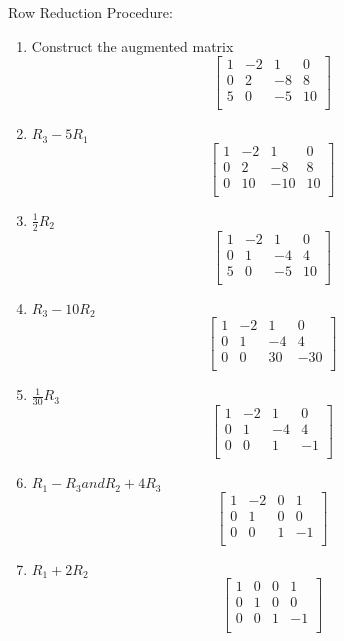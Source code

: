 \documentclass[12pt]{article} %
\begin{document}
\indent Row Reduction Procedure:
\begin{enumerate}
	\item Construct the augmented matrix
		$$\begin{bmatrix}
			1 & -2 & 1 & 0\\ 
			0 & 2 & -8 & 8\\
			5 & 0 & -5 & 10\\
		\end{bmatrix}$$
		
	\item $R_3 - 5R_1$
		$$\begin{bmatrix}
			1 & -2 & 1 & 0\\ 
			0 & 2 & -8 & 8\\
			0 & 10 & -10 & 10\\
		\end{bmatrix}$$

	\item $\frac{1}{2} R_2$
		$$\begin{bmatrix}
			1 & -2 & 1 & 0\\ 
			0 & 1 & -4 & 4\\
			5 & 0 & -5 & 10\\
		\end{bmatrix}$$

	\item $R_3 - 10R_2$
		$$\begin{bmatrix}
			1 & -2 & 1 & 0\\ 
			0 & 1 & -4 & 4\\
			0 & 0 & 30 & -30\\
		\end{bmatrix}$$

	\item $\frac{1}{30}R_3$
		$$\begin{bmatrix}
			1 & -2 & 1 & 0\\ 
			0 & 1 & -4 & 4\\
			0 & 0 & 1 & -1\\
		\end{bmatrix}$$

	\item $R_1 - R_3 and R_2 + 4R_3$
		$$\begin{bmatrix}
			1 & -2 & 0 & 1\\ 
			0 & 1 & 0 & 0\\
			0 & 0 & 1 & -1\\
		\end{bmatrix}$$

	\item $R_1 + 2R_2$
		$$\begin{bmatrix}
			1 & 0 & 0 & 1\\ 
			0 & 1 & 0 & 0\\
			0 & 0 & 1 & -1\\
		\end{bmatrix}$$


\end{enumerate}
\end{document}
